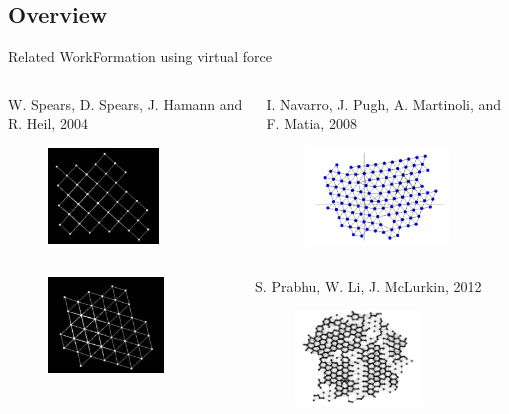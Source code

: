 \documentclass[10pt]{beamer}
\begin{document}
\subsection[problem]{Overview}
\begin{frame}{Related Work}{Formation using virtual force}
   \begin{columns}[T] 
    \begin{column}{.45\textwidth}
      \scriptsize{W. Spears, D. Spears, J. Hamann and R. Heil, 2004}
      \begin{figure}
        \centering
        \includegraphics[height=1in]{figs/spears1.png}
      \end{figure}
    \end{column}%
    \begin{column}{.45\textwidth}
      \scriptsize{I. Navarro, J. Pugh, A. Martinoli, and
        F. Matia, 2008}
      \begin{figure}
        \centering
        \includegraphics[height=1in]{figs/navarro.png}
      \end{figure}      
    \end{column}
  \end{columns}
  \vspace{3mm}
  \begin{columns}[T] 
    \begin{column}{.45\textwidth}
      \begin{figure}
        \centering
        \includegraphics[height=1in]{figs/spears2.png}     
      \end{figure}  
    \end{column}%
    \begin{column}{.45\textwidth}
      \scriptsize{S. Prabhu, W. Li, J. McLurkin, 2012}
      \begin{figure}
        \centering
        \includegraphics[height=1in]{figs/james.png}
      \end{figure}
    \end{column}
  \end{columns}
\end{frame}
\end{document}
